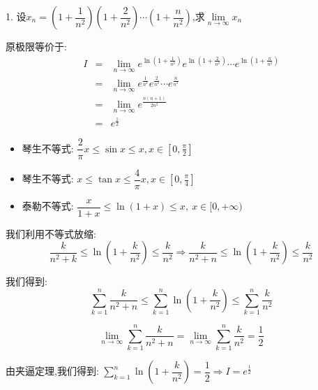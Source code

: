 1. 设$x_{n}=(1+\dfrac{1}{n^2})(1+\dfrac{2}{n^2})\cdots(1+\dfrac{n}{n^2})$,求$\lim\limits_{n\rightarrow\infty}x_{n}$
\begin{solution}
	
	原极限等价于: 
	\begin{eqnarray*}
		I&=&\lim\limits_{n\rightarrow\infty}e^{\ln(1+\frac{1}{n^2})}e^{\ln(1+\frac{2}{n^2})}\cdots e^{\ln(1+\frac{n}{n^2})}\\
		&=&\lim\limits_{n\rightarrow\infty}e^{\frac{1}{n^2}}e^{\frac{2}{n^2}}\cdots e^{\frac{n}{n^2}}\\
		&=&\lim\limits_{n\rightarrow\infty}e^{\frac{n(n+1)}{2n^2}}\\
		&=&e^{\frac{1}{2}}
	\end{eqnarray*}
	\begin{lemma}[不等式放缩]
		\begin{itemize}
			\item $\text{琴生不等式: }\dfrac{2}{\pi}x\leq \sin x\leq x,x\in[0,\frac{\pi}{2}]$
			\item $\text{琴生不等式: }x\leq \tan x\leq \dfrac{4}{\pi}x,x\in[0,\frac{\pi}{4}]$
			\item $\text{泰勒不等式: }\dfrac{x}{1+x}\leq \ln(1+x)\leq x,\ x\in[0,+\infty)$
		\end{itemize}
	\end{lemma}
	我们利用不等式放缩: 
	$$\frac{k}{n^2+k}\leq \ln(1+\frac{k}{n^2})\leq \frac{k}{n^2}\Rightarrow \frac{k}{n^2+n}\leq \ln(1+\frac{k}{n^2})\leq \frac{k}{n^2}$$
	
	我们得到: 
	$$\sum\limits_{k=1}^{n}\frac{k}{n^2+n}\leq \sum\limits_{k=1}^{n}\ln(1+\frac{k}{n^2})\leq \sum\limits_{k=1}^{n}\frac{k}{n^2}$$
	
	$$\lim\limits_{n\rightarrow\infty}\sum\limits_{k=1}^{n}\frac{k}{n^2+n}=\lim\limits_{n\rightarrow\infty}\sum\limits_{k=1}^{n}\dfrac{k}{n^2}=\dfrac{1}{2}$$
	
	由夹逼定理,我们得到: $\sum\limits_{k=1}^{n}\ln(1+\dfrac{k}{n^2})=\dfrac{1}{2}\Rightarrow I=e^{\frac{1}{2}}$
\end{solution}

